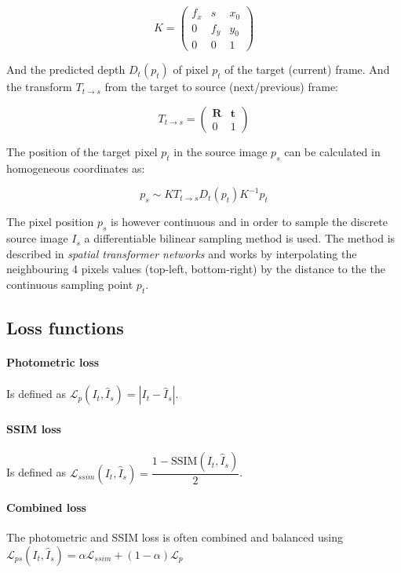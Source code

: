 \[
K = 
\begin{pmatrix}
f_x & s & x_0 \\
0 & f_y & y_0 \\
0 & 0   & 1
\end{pmatrix}
\]

And the predicted depth $ D_t(p_t) $ of pixel $ p_t $ of the target (current) frame. And the transform $ T_{t \rightarrow s} $ from the target to source (next/previous) frame:

\[
T_{t \rightarrow s} =
\begin{pmatrix}
\textbf{R} & \textbf{t} \\
0 & 1
\end{pmatrix}
\]

The position of the target pixel $ p_t $ in the source image $ p_s $ can be calculated in homogeneous coordinates as:

\[
p_s \sim K T_{t \rightarrow s} D_t(p_t) K^{-1} p_t 
\]

The pixel position $ p_s $ is however continuous and in order to sample the discrete source image $ I_s $ a differentiable bilinear sampling method is used. The method is described in \textit{spatial transformer networks}\cite{spatialtransformernetworks} and works by interpolating the neighbouring 4 pixels values (top-left, bottom-right) by the distance to the the continuous sampling point $ p_t $.

\subsection{Loss functions}
\label{sec:loss}

\paragraph{Photometric loss} Is defined as $ \mathcal{L}_p(I_t, \hat{I}_s)=|I_t - \hat{I}_s| $.

\paragraph{SSIM loss} Is defined as $ \mathcal{L}_{ssim}(I_t, \hat{I}_s)=\dfrac{1-\textrm{SSIM}(I_t, \hat{I}_s)}{2} $.

\paragraph{Combined loss} The photometric and SSIM loss is often combined and balanced using $ \mathcal{L}_{ps}(I_t, \hat{I}_s) = \alpha \mathcal{L}_{ssim} + (1-\alpha) \mathcal{L}_p $


